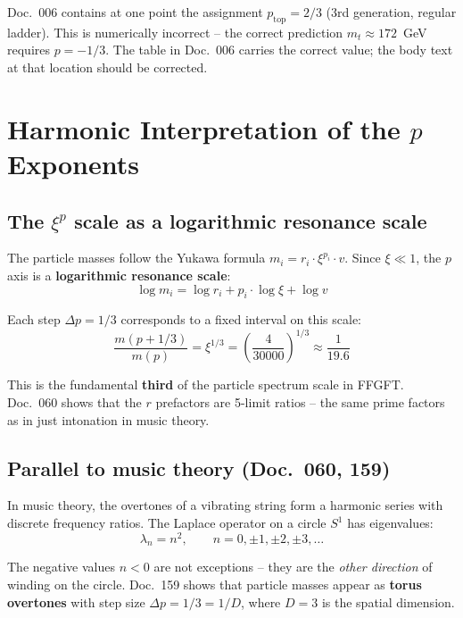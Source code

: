 Doc.~006 contains at one point the assignment $p_{\text{top}} = 2/3$
(3rd generation, regular ladder). This is numerically incorrect --
the correct prediction $m_t \approx 172$~GeV requires $p = -1/3$.
The table in Doc.~006 carries the correct value; the body text at
that location should be corrected.

\section{Harmonic Interpretation of the \texorpdfstring{$p$}{p} Exponents}

\subsection{The \texorpdfstring{$\xi^p$}{xi\^{}p} scale as a logarithmic resonance scale}

The particle masses follow the Yukawa formula $m_i = r_i \cdot \xi^{p_i} \cdot v$.
Since $\xi \ll 1$, the $p$ axis is a \textbf{logarithmic resonance scale}:
\begin{equation}
    \log m_i = \log r_i + p_i \cdot \log \xi + \log v
\end{equation}

Each step $\Delta p = 1/3$ corresponds to a fixed interval on this scale:
\begin{equation}
    \frac{m(p + 1/3)}{m(p)} = \xi^{1/3}
    = \left(\frac{4}{30000}\right)^{1/3} \approx \frac{1}{19.6}
\end{equation}

This is the fundamental \textbf{third} of the particle spectrum scale in FFGFT.
Doc.~060 shows that the $r$ prefactors are 5-limit ratios -- the same prime
factors as in just intonation in music theory.

\subsection{Parallel to music theory (Doc.~060, 159)}

In music theory, the overtones of a vibrating string form a harmonic series
with discrete frequency ratios. The Laplace operator on a circle $S^1$
has eigenvalues:
\begin{equation}
    \lambda_n = n^2, \qquad n = 0, \pm 1, \pm 2, \pm 3, \ldots
\end{equation}

The negative values $n < 0$ are not exceptions -- they are the
\emph{other direction} of winding on the circle. Doc.~159 shows that
particle masses appear as \textbf{torus overtones} with step size
$\Delta p = 1/3 = 1/D$, where $D = 3$ is the spatial dimension.

